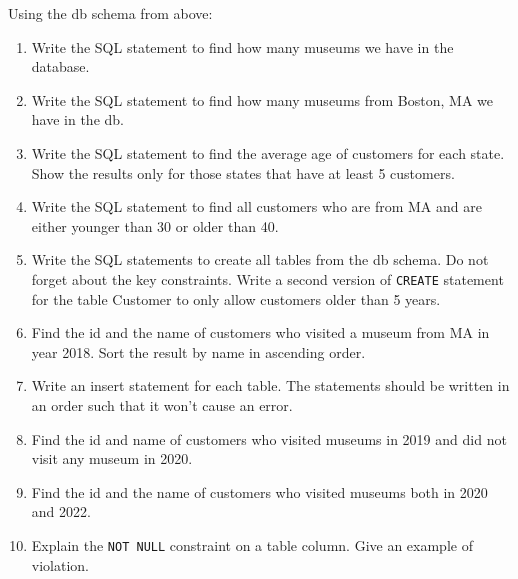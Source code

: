 \documentclass[letterpaper, 11pt]{article}
\begin{document}
Using the db schema from above:
\begin{enumerate}
    \item Write the SQL statement to find how many museums we have in the database.
    \item Write the SQL statement to find how many museums from Boston, MA we have in the db.
    \item Write the SQL statement to find the average age of customers for each state. Show the results only for those states that have at least 5 customers.
    \item Write the SQL statement to find all customers who are from MA and are either younger than 30 or older than 40.
    \item Write the SQL statements to create all tables from the db schema. Do not forget about the key constraints. Write a second version of \texttt{CREATE} statement for the table Customer to only allow customers older than 5 years.
    \item Find the id and the name of customers who visited a museum from MA in year 2018. Sort the result by name in ascending order.
    \item Write an insert statement for each table. The statements should be written in an order such that it won’t cause an error.
    \item Find the id and name of customers who visited museums in 2019 and did not visit any museum in 2020.
    \item Find the id and the name of customers who visited museums both in 2020 and 2022.
    \item Explain the \texttt{NOT NULL} constraint on a table column. Give an example of violation.


\end{enumerate}
\end{document}
